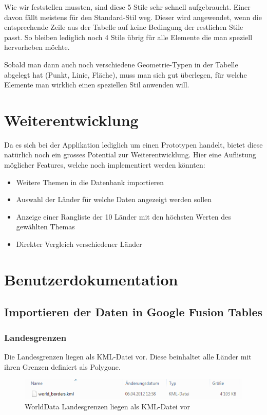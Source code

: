 Wie wir feststellen mussten, sind diese 5 Stile sehr schnell aufgebraucht. Einer davon fällt meistens für den Standard-Stil weg. Dieser wird angewendet, wenn die entsprechende Zeile aus der Tabelle auf keine Bedingung der restlichen Stile passt. So bleiben lediglich noch 4 Stile übrig für alle Elemente die man speziell hervorheben möchte.

Sobald man dann auch noch verschiedene Geometrie-Typen in der Tabelle abgelegt hat (Punkt, Linie, Fläche), muss man sich gut überlegen, für welche Elemente man wirklich einen speziellen Stil anwenden will.

\section{Weiterentwicklung}
Da es sich bei der Applikation lediglich um einen Prototypen handelt, bietet diese natürlich noch ein grosses Potential zur Weiterentwicklung. Hier eine Auflistung möglicher Features, welche noch implementiert werden könnten:

\begin{itemize}
\item Weitere Themen in die Datenbank importieren
\item Auswahl der Länder für welche Daten angezeigt werden sollen
\item Anzeige einer Rangliste der 10 Länder mit den höchsten Werten des gewählten Themas
\item Direkter Vergleich verschiedener Länder
\end{itemize}


\section{Benutzerdokumentation}
\subsection{Importieren der Daten in Google Fusion Tables}

\subsubsection{Landesgrenzen}
\label{landesgrenzen}
Die Landesgrenzen liegen als KML-Datei vor. Diese beinhaltet alle Länder mit ihren Grenzen definiert als Polygone.

\begin{figure}[!h]
	\centering
	\includegraphics{images/usecase1-worlddata/documentation/worlddata-worldborders_kml.png}
	\caption{WorldData Landesgrenzen liegen als KML-Datei vor}
	\label{worlddata-worldborders_kml}
\end{figure}

